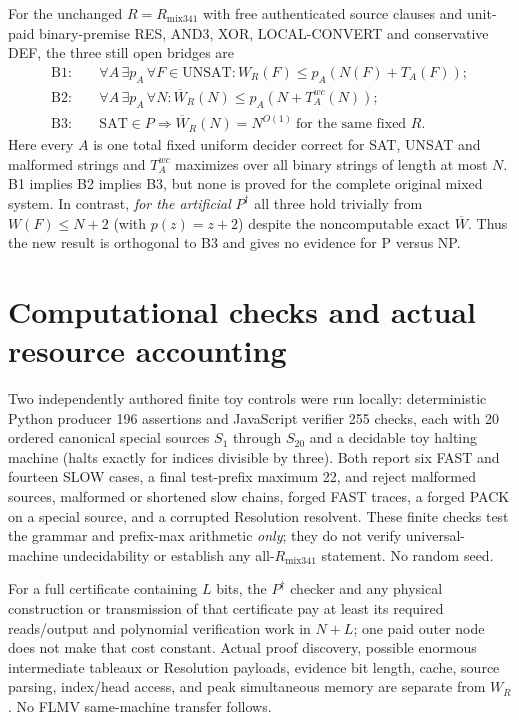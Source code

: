 \documentclass[11pt]{article}
\begin{document}
For the unchanged $R=R_{\mathrm{mix341}}$ with free authenticated source clauses and unit-paid binary-premise RES, AND3, XOR, LOCAL-CONVERT and conservative DEF, the three still open bridges are
\[
\begin{aligned}
 \mathrm{B1}:&\quad \forall A\,\exists p_A\,\forall F\in\mathrm{UNSAT}:
 W_R(F)\le p_A(N(F)+T_A(F));\\
 \mathrm{B2}:&\quad \forall A\,\exists p_A\,\forall N:
 \overline W_R(N)\le p_A(N+T_A^{wc}(N));\\
 \mathrm{B3}:&\quad \mathrm{SAT}\in P\Longrightarrow
 \overline W_R(N)=N^{O(1)}\ \text{for the same fixed }R.
\end{aligned}
\]
Here every $A$ is one total fixed uniform decider correct for SAT, UNSAT and malformed strings and $T_A^{wc}$ maximizes over all binary strings of length at most $N$. B1 implies B2 implies B3, but none is proved for the complete original mixed system. In contrast, \emph{for the artificial} $P^\dagger$ all three hold trivially from $W(F)\le N+2$ (with $p(z)=z+2$) despite the noncomputable exact $\overline W$. Thus the new result is orthogonal to B3 and gives no evidence for P versus NP.

\section*{Computational checks and actual resource accounting}
Two independently authored finite toy controls were run locally: deterministic Python producer 196 assertions and JavaScript verifier 255 checks, each with 20 ordered canonical special sources $S_1$ through $S_{20}$ and a decidable toy halting machine (halts exactly for indices divisible by three). Both report six FAST and fourteen SLOW cases, a final test-prefix maximum 22, and reject malformed sources, malformed or shortened slow chains, forged FAST traces, a forged PACK on a special source, and a corrupted Resolution resolvent. These finite checks test the grammar and prefix-max arithmetic \emph{only}; they do not verify universal-machine undecidability or establish any all-$R_{\mathrm{mix341}}$ statement. No random seed.

For a full certificate containing $L$ bits, the $P^\dagger$ checker and any physical construction or transmission of that certificate pay at least its required reads/output and polynomial verification work in $N+L$; one paid outer node does not make that cost constant. Actual proof discovery, possible enormous intermediate tableaux or Resolution payloads, evidence bit length, cache, source parsing, index/head access, and peak simultaneous memory are separate from $W_R$. No FLMV same-machine transfer follows.
\end{document}
